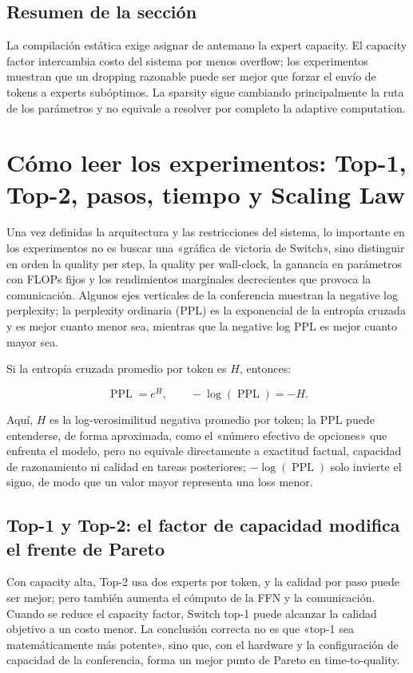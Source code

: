 \documentclass[a4paper]{article}
\begin{document}
\subsection{Resumen de la sección}

La compilación estática exige asignar de antemano la expert capacity. El capacity factor intercambia costo del sistema por menos overflow; los experimentos muestran que un dropping razonable puede ser mejor que forzar el envío de tokens a experts subóptimos. La sparsity sigue cambiando principalmente la ruta de los parámetros y no equivale a resolver por completo la adaptive computation.
\section{Cómo leer los experimentos: Top-1, Top-2, pasos, tiempo y Scaling Law}

Una vez definidas la arquitectura y las restricciones del sistema, lo importante en los experimentos no es buscar una «gráfica de victoria de Switch», sino distinguir en orden la quality per step, la quality per wall-clock, la ganancia en parámetros con FLOPs fijos y los rendimientos marginales decrecientes que provoca la comunicación. Algunos ejes verticales de la conferencia muestran la negative log perplexity; la perplexity ordinaria (PPL) es la exponencial de la entropía cruzada y es mejor cuanto menor sea, mientras que la negative log PPL es mejor cuanto mayor sea.

Si la entropía cruzada promedio por token es $H$, entonces:

\[
\operatorname{PPL}=e^{H},\qquad -\log(\operatorname{PPL})=-H.
\]

Aquí, $H$ es la log-verosimilitud negativa promedio por token; la PPL puede entenderse, de forma aproximada, como el «número efectivo de opciones» que enfrenta el modelo, pero no equivale directamente a exactitud factual, capacidad de razonamiento ni calidad en tareas posteriores; $-\log(\operatorname{PPL})$ solo invierte el signo, de modo que un valor mayor representa una loss menor.

\subsection{Top-1 y Top-2: el factor de capacidad modifica el frente de Pareto}

Con capacity alta, Top-2 usa dos experts por token, y la calidad por paso puede ser mejor; pero también aumenta el cómputo de la FFN y la comunicación. Cuando se reduce el capacity factor, Switch top-1 puede alcanzar la calidad objetivo a un costo menor. La conclusión correcta no es que «top-1 sea matemáticamente más potente», sino que, con el hardware y la configuración de capacidad de la conferencia, forma un mejor punto de Pareto en time-to-quality.
\end{document}
